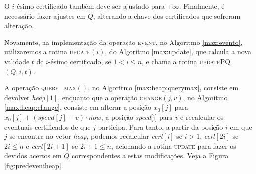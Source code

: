 

O $i$-ésimo certificado também deve ser ajustado para $+\infty$.
Finalmente, é necessário fazer ajustes em $Q$, alterando a chave dos
certificados que sofreram alteração.

Novamente, na implementação da operação \textsc{event}, no Algoritmo
\ref{max:evento}, utilizaremos a rotina \textsc{update}$(i)$, do
Algoritmo \ref{max:update}, que calcula a nova validade $t$ do
$i$-ésimo certificado, se $1 < i \leq n$, e chama a rotina
\textsc{updatePQ}$(Q, i, t)$.





A operação \textsc{query\_max}$()$, no Algoritmo
\ref{max:heap:querymax}, consiste em devolver \textit{heap}$[1]$,
enquanto que a operação \textsc{change}$(j, v)$, no Algoritmo
\ref{max:heap:change}, consiste em alterar a posição $x_0[j]$ para
${x_0[j] + (\mathit{speed}[j] - v)\cdot now}$, a posição
\textit{speed}[j] para \textit{v} e recalcular os eventuais
certificados de que $j$ participa. Para tanto, a partir da posição
$i$ em que $j$ se encontra no vetor \textit{heap}, podemos
recalcular \textit{cert}$[i]$ se $i > 1$, \textit{cert}$[2i]$ se $2i
\leq n$ e \textit{cert}$[2i + 1]$ se $2i + 1 \leq n$, acionando a
rotina \textsc{update} para fazer os devidos acertos em $Q$
correspondentes a estas modificações. Veja a Figura
\ref{fig:predeventheap}.






